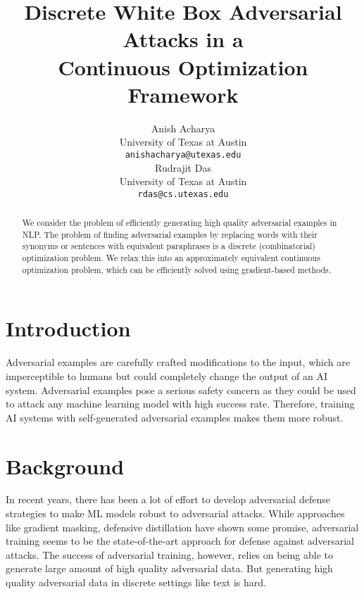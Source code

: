 \documentclass[11pt,a4paper]{article}
\title{Discrete White Box Adversarial Attacks in a\\ Continuous Optimization Framework}
\author{Anish Acharya \\
 University of Texas at Austin\\
  \texttt{anishacharya@utexas.edu} \\\And
 Rudrajit Das \\
 University of Texas at Austin \\
  \texttt{rdas@cs.utexas.edu} \\}
\date{}
\begin{document}
\maketitle
\begin{abstract}
We consider the problem of efficiently generating high quality adversarial examples in NLP. 
The problem of finding adversarial examples by replacing words with their synonyms or sentences with equivalent paraphrases is a discrete (combinatorial) optimization problem. We relax this into an approximately equivalent continuous optimization problem, which can be efficiently solved using gradient-based methods.
\end{abstract}

\section{Introduction}
Adversarial examples are carefully crafted modifications to the input, %
which are imperceptible to humans but could completely change the output of an AI system. 
Adversarial examples pose a serious %
safety concern as they could be used to attack any machine learning model with high success rate. %
Therefore, training AI systems with self-generated adversarial examples makes them more robust. 

\section{Background}
In recent years, there has been a lot of effort to develop adversarial defense strategies to make ML models robust to adversarial attacks. While approaches like gradient masking, defensive distillation have shown some promise, adversarial training seems to be the state-of-the-art approach for defense against adversarial attacks. The success of adversarial training, however, relies on being able to generate large amount of high quality adversarial data. But generating high quality adversarial data in discrete settings like text is %
hard.
\end{document}
